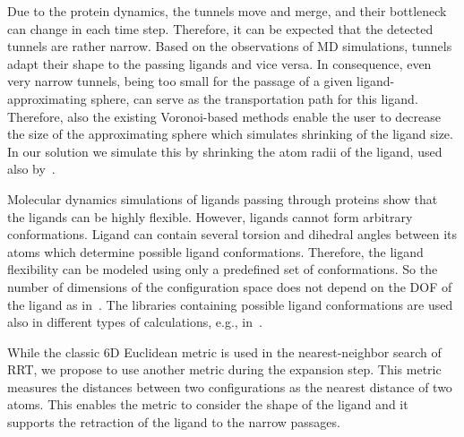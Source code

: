 \documentclass[usletter, 10pt, conference]{ieeeconf} %
\begin{document}
Due to the protein dynamics, the tunnels move and merge, and their bottleneck can change in each time step.
Therefore, it can be expected that the detected tunnels are rather narrow.
Based on the observations of MD simulations, tunnels adapt their shape to the passing ligands and vice versa.
In consequence, even very narrow tunnels, being too small for the passage of a given ligand-approximating sphere, can serve as the transportation path for this ligand.
Therefore, also the existing Voronoi-based methods enable the user to decrease the size of the approximating sphere which simulates shrinking of the ligand size.
In our solution we simulate this by shrinking the atom radii of the ligand, used also by~\cite{cortes2010simulating,guieysse2008structure}.

Molecular dynamics simulations of ligands passing through proteins show that the ligands can be highly flexible.
However, ligands cannot form arbitrary conformations. 
Ligand can contain several torsion and dihedral angles between its atoms which determine possible ligand conformations.
Therefore, the ligand flexibility can be modeled using only a predefined set of conformations.
So the number of dimensions of the configuration space does not depend on the DOF of the ligand as in~\cite{cortes2010simulating}.
The libraries containing possible ligand conformations are used also in different types of calculations, e.g., in~\cite{kellogg}. 

While the classic 6D Euclidean metric is used in the nearest-neighbor search of RRT, we propose to use another metric during the expansion step.
This metric measures the distances between two configurations as the nearest distance of two atoms. 
This enables the metric to consider the shape of the ligand and it supports the retraction of the ligand to the narrow passages.


\end{document}
